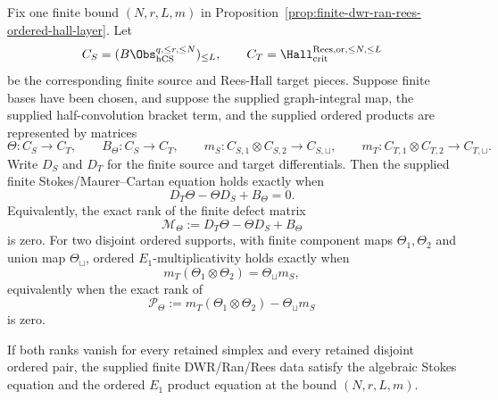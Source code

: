 \begin{proposition}
\label{prop:finite-stokes-hcs-hall-source-gate}
Fix one finite bound \((N,r,L,m)\) in
Proposition~\ref{prop:finite-dwr-ran-rees-ordered-hall-layer}. Let
\[
 C_S=(B\Obs_{\mathrm{hCS}}^{q,\le r,\le N})_{\le L},
 \qquad
 C_T=\Hall_{\mathrm{crit}}^{\mathrm{Rees},\mathrm{or},\le N,\le L}
\]
be the corresponding finite source and Rees-Hall target pieces. Suppose
finite bases have been chosen, and suppose the supplied graph-integral
map, the supplied half-convolution bracket term, and the supplied
ordered products are represented by matrices
\[
 \Theta\colon C_S\to C_T,\qquad
 B_\Theta\colon C_S\to C_T,\qquad
 m_S\colon C_{S,1}\otimes C_{S,2}\to C_{S,\sqcup},
 \qquad
 m_T\colon C_{T,1}\otimes C_{T,2}\to C_{T,\sqcup}.
\]
Write \(D_S\) and \(D_T\) for the finite source and target
differentials. Then the supplied finite Stokes/Maurer--Cartan equation
holds exactly when
\[
 D_T\Theta-\Theta D_S+B_\Theta=0.
\]
Equivalently, the exact rank of the finite defect matrix
\[
 \mathcal M_\Theta:=D_T\Theta-\Theta D_S+B_\Theta
\]
is zero. For two disjoint ordered supports, with finite component maps
\(\Theta_1,\Theta_2\) and union map \(\Theta_\sqcup\), ordered
\(E_1\)-multiplicativity holds exactly when
\[
 m_T(\Theta_1\otimes \Theta_2)=\Theta_\sqcup m_S,
\]
equivalently when the exact rank of
\[
 \mathcal P_\Theta
 :=
 m_T(\Theta_1\otimes \Theta_2)-\Theta_\sqcup m_S
\]
is zero.

If both ranks vanish for every retained simplex and every retained
disjoint ordered pair, the supplied finite DWR/Ran/Rees data satisfy
the algebraic Stokes equation and the ordered \(E_1\) product equation
at the bound \((N,r,L,m)\).
\end{proposition}

